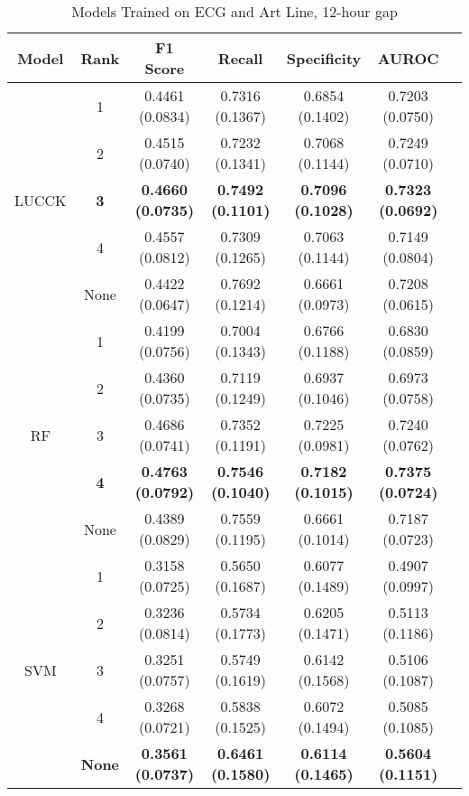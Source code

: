 \begin{table}
    \centering
    \caption{Models Trained on ECG and Art Line, 12-hour gap}
    \begin{tabularx}{\textwidth}{|C|C|C|C|C|C|C|}
        \hline
        Model & Rank & F1 Score & Recall & Specificity & AUROC \\
        \hline
         & 1 & 0.4461 (0.0834) & 0.7316 (0.1367) & 0.6854 (0.1402) & 0.7203 (0.0750)\\
         & 2 & 0.4515 (0.0740) & 0.7232 (0.1341) & 0.7068 (0.1144) & 0.7249 (0.0710)\\
        LUCCK & \textbf{3} & \textbf{0.4660 (0.0735)} & \textbf{0.7492 (0.1101)} & \textbf{0.7096 (0.1028)} & \textbf{0.7323 (0.0692)}\\
         & 4 & 0.4557 (0.0812) & 0.7309 (0.1265) & 0.7063 (0.1144) & 0.7149 (0.0804)\\
         & None & 0.4422 (0.0647) & 0.7692 (0.1214) & 0.6661 (0.0973) & 0.7208 (0.0615)\\
        \hline
         & 1 & 0.4199 (0.0756) & 0.7004 (0.1343) & 0.6766 (0.1188) & 0.6830 (0.0859)\\
         & 2 & 0.4360 (0.0735) & 0.7119 (0.1249) & 0.6937 (0.1046) & 0.6973 (0.0758)\\
        RF & 3 & 0.4686 (0.0741) & 0.7352 (0.1191) & 0.7225 (0.0981) & 0.7240 (0.0762)\\
         & \textbf{4} & \textbf{0.4763 (0.0792)} & \textbf{0.7546 (0.1040)} & \textbf{0.7182 (0.1015)} & \textbf{0.7375 (0.0724)}\\
         & None & 0.4389 (0.0829) & 0.7559 (0.1195) & 0.6661 (0.1014) & 0.7187 (0.0723)\\
        \hline
         & 1 & 0.3158 (0.0725) & 0.5650 (0.1687) & 0.6077 (0.1489) & 0.4907 (0.0997)\\
         & 2 & 0.3236 (0.0814) & 0.5734 (0.1773) & 0.6205 (0.1471) & 0.5113 (0.1186)\\
        SVM & 3 & 0.3251 (0.0757) & 0.5749 (0.1619) & 0.6142 (0.1568) & 0.5106 (0.1087)\\
         & 4 & 0.3268 (0.0721) & 0.5838 (0.1525) & 0.6072 (0.1494) & 0.5085 (0.1085)\\
         & \textbf{None} & \textbf{0.3561 (0.0737)} & \textbf{0.6461 (0.1580)} & \textbf{0.6114 (0.1465)} & \textbf{0.5604 (0.1151)}\\
         \hline
    \end{tabularx}
\end{table}

